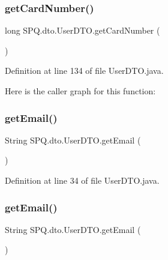 \subsubsection{\texorpdfstring{get\+Card\+Number()}{getCardNumber()}}
{\footnotesize\ttfamily long S\+P\+Q.\+dto.\+User\+D\+T\+O.\+get\+Card\+Number (\begin{DoxyParamCaption}{ }\end{DoxyParamCaption})}



Definition at line 134 of file User\+D\+T\+O.\+java.

Here is the caller graph for this function\+:
\mbox{\label{class_s_p_q_1_1dto_1_1_user_d_t_o_a67038ab8bab7cb7119ece00bcb20a360}} 
\subsubsection{\texorpdfstring{get\+Email()}{getEmail()}\hspace{0.1cm}{\footnotesize\ttfamily [1/3]}}
{\footnotesize\ttfamily String S\+P\+Q.\+dto.\+User\+D\+T\+O.\+get\+Email (\begin{DoxyParamCaption}{ }\end{DoxyParamCaption})}



Definition at line 34 of file User\+D\+T\+O.\+java.

\mbox{\label{class_s_p_q_1_1dto_1_1_user_d_t_o_a67038ab8bab7cb7119ece00bcb20a360}} 
\subsubsection{\texorpdfstring{get\+Email()}{getEmail()}\hspace{0.1cm}{\footnotesize\ttfamily [2/3]}}
{\footnotesize\ttfamily String S\+P\+Q.\+dto.\+User\+D\+T\+O.\+get\+Email (\begin{DoxyParamCaption}{ }\end{DoxyParamCaption})}



